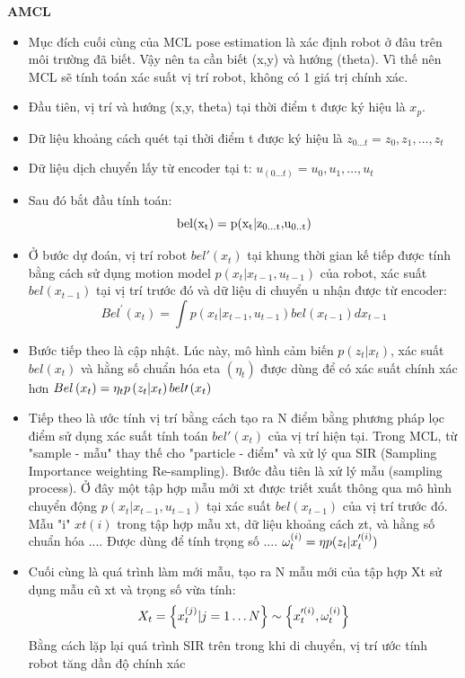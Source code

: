 \textbf{AMCL}\\
\begin{itemize}
	\item Mục đích cuối cùng của MCL pose estimation là xác định robot ở đâu trên môi trường đã biết. Vậy nên ta cần biết (x,y) và hướng (theta). Vì thế nên MCL sẽ tính toán xác suất vị trí robot, không có 1 giá trị chính xác.
	\item Đầu tiên, vị trí và hướng (x,y, theta) tại thời điểm t được ký hiệu là $x_p$.
	\item Dữ liệu khoảng cách quét tại thời điểm t được ký hiệu là $z_{0…t}={z_0,z_1,…, z_t}$
	\item Dữ liệu dịch chuyển lấy từ encoder tại t: $u_(0…t)={u_0,u_1, …, u_t}$
	\item Sau đó bắt đầu tính toán:
	\[{\rm{bel(}}{{\rm{x}}_{\rm{t}}}{\rm{)  =  p(}}{{\rm{x}}_{\rm{t}}}{\rm{|}}{{\rm{z}}_{{\rm{0}}...{\rm{t}}}}{\rm{, }}{{\rm{u}}_{{\rm{0}}..{\rm{t}}}}{\rm{)}}\]
	\item Ở bước dự đoán, vị trí robot $bel'({x_t})$ tại khung thời gian kế tiếp được tính bằng cách sử dụng motion model $p({x_t}|{x_{t - 1}},{u_{t - 1}})$ của robot, xác suất $bel({x_{t - 1}})$ tại vị trí trước đó và dữ liệu di chuyển u nhận được từ encoder:
	$$Be{l^\prime }\left( {{x_t}} \right) = \int p\left( {{x_t}|{x_{t - 1}},{u_{t - 1}}} \right)bel\left( {{x_{t - 1}}} \right)d{x_{t - 1}}$$
	\item Bước tiếp theo là cập nhật. Lúc này, mô hình cảm biến $p(z_t |x_t)$, xác suất $bel(x_t)$ và hằng số chuẩn hóa eta $({\eta _t})$ được dùng để có xác suất chính xác hơn $Bel\left( {{x_t}} \right) = {{\rm{\eta }}_t}p\left( {{z_t}|{x_t}} \right)bel\prime \left( {{x_t}} \right)$
	\item Tiếp theo là ước tính vị trí bằng cách tạo ra N điểm bằng phương pháp lọc điểm sử dụng xác suất tính toán $bel'({x_t})$ của vị trí hiện tại. Trong MCL, từ "sample - mẫu" thay thế cho "particle - điểm" và xử lý qua SIR (Sampling Importance weighting Re-sampling). Bước đầu tiên là xử lý mẫu (sampling process). Ở đây một tập hợp mẫu mới xt được triết xuất thông qua mô hình chuyển động $p({x_t}|{x_{t - 1}},{u_{t - 1}})$  tại xác suất $bel({x_{t - 1}})$ của vị trí trước đó. Mẫu "i" $xt(i)$ trong tập hợp mẫu xt, dữ liệu khoảng cách zt, và hằng số chuẩn hóa .... Được dùng  để tính trọng số ....
	$\omega _t^{\left( i \right)} = {\rm{\eta }}p({z_t}|x_t^{\prime \left( i \right)})$
	\item Cuối cùng là quá trình làm mới mẫu, tạo ra N mẫu mới của tập hợp Xt sử dụng mẫu cũ xt và trọng số vừa tính:
	\[{X_t} = \left\{ {x_t^{\left( j \right)}{\rm{|}}j = 1 \ldots N} \right\} \sim \left\{ {x_t^{\prime \left( i \right)},\omega _t^{\left( i \right)}} \right\}\]
	Bằng cách lặp lại quá trình SIR trên trong khi di chuyển, vị trí ước tính robot tăng dần độ chính xác
\end{itemize}

